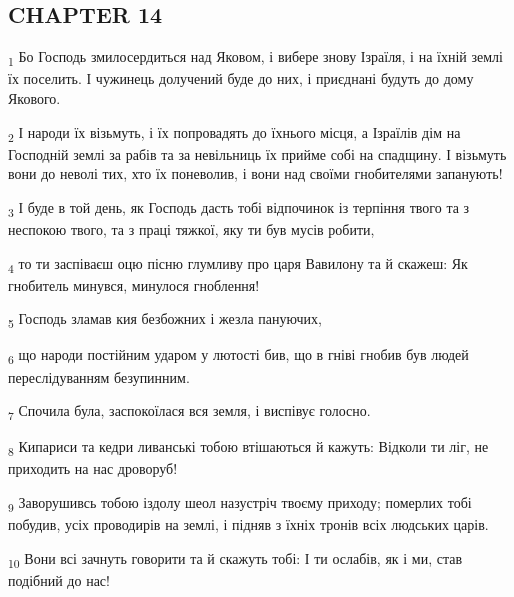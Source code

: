 \subsection{CHAPTER 14}
\begin{tcolorbox}
\textsubscript{1} Бо Господь змилосердиться над Яковом, і вибере знову Ізраїля, і на їхній землі їх поселить. І чужинець долучений буде до них, і приєднані будуть до дому Якового.
\end{tcolorbox}
\begin{tcolorbox}
\textsubscript{2} І народи їх візьмуть, і їх попровадять до їхнього місця, а Ізраїлів дім на Господній землі за рабів та за невільниць їх прийме собі на спадщину. І візьмуть вони до неволі тих, хто їх поневолив, і вони над своїми гнобителями запанують!
\end{tcolorbox}
\begin{tcolorbox}
\textsubscript{3} І буде в той день, як Господь дасть тобі відпочинок із терпіння твого та з неспокою твого, та з праці тяжкої, яку ти був мусів робити,
\end{tcolorbox}
\begin{tcolorbox}
\textsubscript{4} то ти заспіваєш оцю пісню глумливу про царя Вавилону та й скажеш: Як гнобитель минувся, минулося гноблення!
\end{tcolorbox}
\begin{tcolorbox}
\textsubscript{5} Господь зламав кия безбожних і жезла пануючих,
\end{tcolorbox}
\begin{tcolorbox}
\textsubscript{6} що народи постійним ударом у лютості бив, що в гніві гнобив був людей переслідуванням безупинним.
\end{tcolorbox}
\begin{tcolorbox}
\textsubscript{7} Спочила була, заспокоїлася вся земля, і виспівує голосно.
\end{tcolorbox}
\begin{tcolorbox}
\textsubscript{8} Кипариси та кедри ливанські тобою втішаються й кажуть: Відколи ти ліг, не приходить на нас дроворуб!
\end{tcolorbox}
\begin{tcolorbox}
\textsubscript{9} Заворушивсь тобою іздолу шеол назустріч твоєму приходу; померлих тобі побудив, усіх проводирів на землі, і підняв з їхніх тронів всіх людських царів.
\end{tcolorbox}
\begin{tcolorbox}
\textsubscript{10} Вони всі зачнуть говорити та й скажуть тобі: І ти ослабів, як і ми, став подібний до нас!
\end{tcolorbox}
